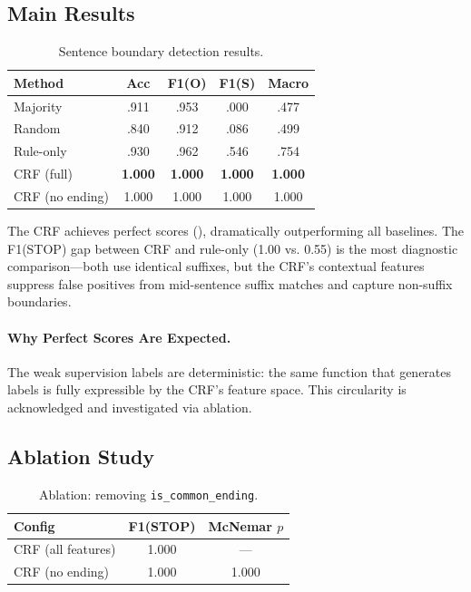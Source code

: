 \documentclass[11pt,a4paper]{article}
\begin{document}
\subsection{Main Results}

\begin{table}[t]
\small
\centering
\caption{Sentence boundary detection results.}
\label{tab:results}
\begin{tabular}{lcccc}
\toprule
\textbf{Method} & \textbf{Acc} & \textbf{F1(O)} & \textbf{F1(S)} & \textbf{Macro} \\
\midrule
Majority & .911 & .953 & .000 & .477 \\
Random & .840 & .912 & .086 & .499 \\
Rule-only & .930 & .962 & .546 & .754 \\
\midrule
CRF (full) & \textbf{1.000} & \textbf{1.000} & \textbf{1.000} & \textbf{1.000} \\
CRF (no ending) & 1.000 & 1.000 & 1.000 & 1.000 \\
\bottomrule
\end{tabular}
\end{table}

The CRF achieves perfect scores (), dramatically outperforming all baselines. The F1(STOP) gap between CRF and rule-only (1.00 vs. 0.55) is the most diagnostic comparison—both use identical suffixes, but the CRF's contextual features suppress false positives from mid-sentence suffix matches and capture non-suffix boundaries.

\paragraph{Why Perfect Scores Are Expected.} The weak supervision labels are deterministic: the same function that generates labels is fully expressible by the CRF's feature space. This circularity is acknowledged and investigated via ablation.

\subsection{Ablation Study}

\begin{table}[t]
\small
\centering
\caption{Ablation: removing \texttt{is\_common\_ending}.}
\label{tab:ablation}
\begin{tabular}{lcc}
\toprule
\textbf{Config} & \textbf{F1(STOP)} & \textbf{McNemar $p$} \\
\midrule
CRF (all features) & 1.000 & --- \\
CRF (no ending) & 1.000 & 1.000 \\
\bottomrule
\end{tabular}
\end{table}
\end{document}
